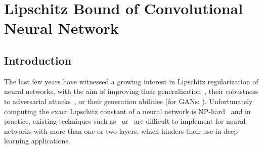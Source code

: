
\chapter{Lipschitz Bound of Convolutional Neural Network}
\label{chapter:lipschitz_bound}
\localtableofcontents



\section{Introduction}
\label{section:ch4-introduction}


The last few years have witnessed a growing interest in Lipschitz regularization of neural networks, with the aim of improving their generalization~\cite{bartlett2017spectrally}, their robustness to adversarial attacks~\cite{tsuzuku2018lipschitz, farnia2018generalizable}, or their generation abilities (\eg for GANs: \cite{miyato2018spectral,arjovsky2017wasserstein}).
Unfortunately computing  the exact Lipschitz constant of a neural network is NP-hard~\cite{scaman2018lipschitz} and in practice, existing techniques such as~\cite{scaman2018lipschitz, NIPS2019_9319} or~\cite{latorre2020lipschitz} are difficult to implement for neural networks with more than one or two layers, which hinders their use in deep learning applications.


